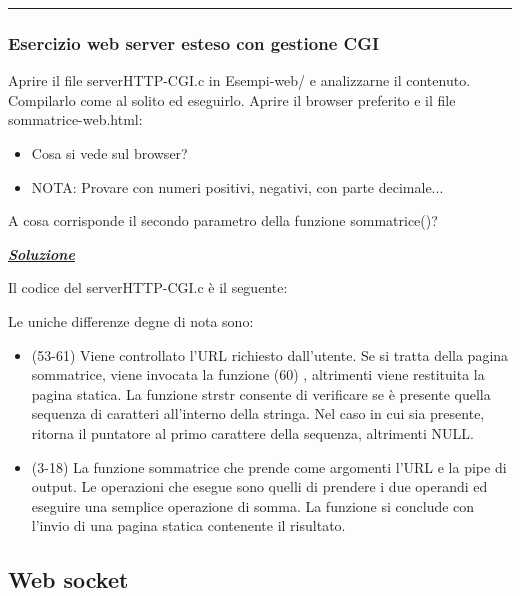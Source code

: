 \documentclass[a4paper]{article}
\newcommand{\longline}{\noindent\rule{\textwidth}{0.4pt}}
\begin{document}
	\longline
	
	\subsubsection[\textcolor{Red3}{\textbf{Esercizio}} web server esteso con gestione CGI]{Esercizio web server esteso con gestione CGI}
	
	Aprire il file \textsf{serverHTTP-CGI.c} in \textsf{Esempi-web/} e analizzarne il contenuto. Compilarlo come al solito ed eseguirlo. Aprire il browser preferito e il file \textsf{sommatrice-web.html}:
	\begin{itemize}
		\item Cosa si vede sul browser?
		\item NOTA: Provare con numeri positivi, negativi, con parte decimale...
	\end{itemize}
	A cosa corrisponde il secondo parametro della funzione \textsf{sommatrice()}?\newline
	
	\noindent
	\textcolor{Green4}{\underline{\textbf{\emph{Soluzione}}}}\newline
	
	\noindent
	Il codice del \textsf{serverHTTP-CGI.c} è il seguente:
	\newpage
	
	\noindent
	Le uniche differenze degne di nota sono:
	\begin{itemize}
		\item (53-61) Viene controllato l'URL richiesto dall'utente. Se si tratta della pagina sommatrice, viene invocata la funzione (60) , altrimenti viene restituita la pagina statica. La funzione \textsf{strstr} consente di verificare se è presente quella sequenza di caratteri all'interno della stringa. Nel caso in cui sia presente, ritorna il puntatore al primo carattere della sequenza, altrimenti \textsf{NULL}.
		
		\item (3-18) La funzione sommatrice che prende come argomenti l'URL e la pipe di output. Le operazioni che esegue sono quelli di prendere i due operandi ed eseguire una semplice operazione di somma. La funzione si conclude con l'invio di una pagina statica contenente il risultato.
	\end{itemize}
	
	\newpage

	\subsection{Web socket}
	
\end{document}
